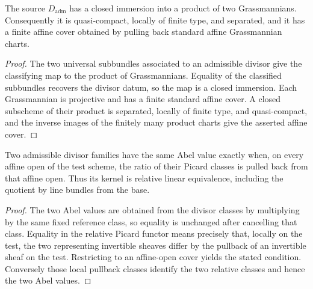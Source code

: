 \begin{theorem}
  \label{pa-thm:admissibleDivisorSource_projectLocal}
  \leanok

  The source \(D_{\mathrm{adm}}\) has a closed immersion into a product of two
  Grassmannians.  Consequently it is quasi-compact, locally of finite type, and separated,
  and it has a finite affine cover obtained by pulling back standard affine Grassmannian
  charts.
\end{theorem}
\begin{proof}
  The two universal subbundles associated to an admissible divisor give the classifying map
  to the product of Grassmannians.  Equality of the classified subbundles recovers the
  divisor datum, so the map is a closed immersion.  Each Grassmannian is projective and has a
  finite standard affine cover.  A closed subscheme of their product is separated, locally
  of finite type, and quasi-compact, and the inverse images of the finitely many product
  charts give the asserted affine cover.
\end{proof}

\begin{theorem}
  \label{pa-thm:admissibleAbel_kernel}
  \leanok

  Two admissible divisor families have the same Abel value exactly when, on every affine open
  of the test scheme, the ratio of their Picard classes is pulled back from that affine open.
  Thus its kernel is relative linear equivalence, including the quotient by line bundles from
  the base.
\end{theorem}
\begin{proof}
  The two Abel values are obtained from the divisor classes by multiplying by the same fixed
  reference class, so equality is unchanged after cancelling that class.  Equality in the
  relative Picard functor means precisely that, locally on the test, the two representing
  invertible sheaves differ by the pullback of an invertible sheaf on the test.  Restricting
  to an affine-open cover yields the stated condition.  Conversely those local pullback
  classes identify the two relative classes and hence the two Abel values.
\end{proof}

